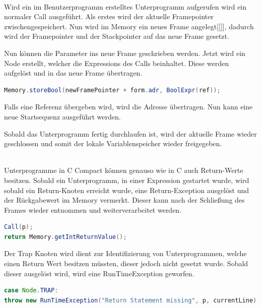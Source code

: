 \\
Wird ein im Benutzerprogramm erstelltes Unterprogramm aufgerufen wird ein normaler Call ausgeführt. Als erstes wird der aktuelle Framepointer zwischengespeichert. Nun wird im Memory ein neues Frame angelegt[\ref{}], dadurch wird der Framepointer und der Stackpointer auf das neue Frame gesetzt.

Nun können die Parameter ins neue Frame geschrieben werden. Jetzt wird ein Node erstellt, welcher die Expressions des Calls beinhaltet. Diese werden aufgelöst und in das neue Frame übertragen. 
\begin{lstlisting}[language=JAVA]
Memory.storeBool(newFramePointer + form.adr, BoolExpr(ref));
\end{lstlisting}
Falls eine Referenz übergeben wird, wird die Adresse übertragen. Nun kann eine neue Startsequenz ausgeführt werden.

Sobald das Unterprogramm fertig durchlaufen ist, wird der aktuelle Frame wieder geschlossen und somit der lokale Variablenspeicher wieder freigegeben.

\\
Unterprogramme in C Compact können genauso wie in C auch Return-Werte besitzen. Sobald ein Unterprogramm, in einer Expression gestartet wurde, wird sobald ein Return-Knoten erreicht wurde, eine Return-Exception ausgelöst und der Rückgabewert im Memory vermerkt. Dieser kann nach der Schließung des Frames wieder entnommen und weiterverarbeitet werden.
\begin{lstlisting}[language=JAVA]
Call(p);
return Memory.getIntReturnValue();	
\end{lstlisting}

Der Trap Knoten wird dient zur Identifizierung von Unterprogrammen, welche einen Return Wert besitzen müssten, dieser jedoch nicht gesetzt wurde. Sobald dieser ausgelöst wird, wird eine RunTimeException geworfen.
\begin{lstlisting}[language=JAVA]
case Node.TRAP:
throw new RunTimeException("Return Statement missing", p, currentLine); 
\end{lstlisting}
